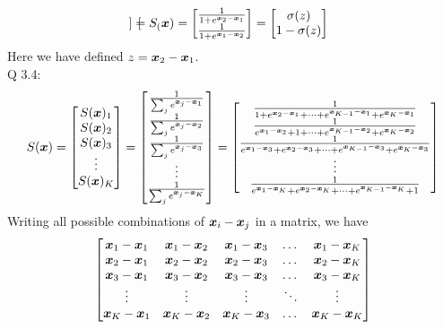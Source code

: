 {$$\begin{bmatrix}
\end{bmatrix}
=
S_({\bm{x}})=\begin{bmatrix}
    \frac{1}{1+e^{{\bm{x}}_2-{\bm{x}}_1}}\\
    \frac{1}{1+e^{{\bm{x}}_1-{\bm{x}}_2}}
\end{bmatrix}
=\begin{bmatrix}
    \sigma(z) \\
    1-\sigma(z)
\end{bmatrix}
$$
Here we have defined $z={\bm{x}}_2-{\bm{x}}_1$.\\
Q 3.4: $$S({\bm{x}})=\begin{bmatrix}
    S({\bm{x}})_1 \\
    S({\bm{x}})_2\\
    S({\bm{x}})_3\\ 
    \vdots  \\
     S({\bm{x}})_K
\end{bmatrix}
=
\begin{bmatrix}
    \frac{1}{\sum_j e^{{\bm{x}}_j-{\bm{x}}_1}}\\
    \frac{1}{\sum_j e^{{\bm{x}}_j-{\bm{x}}_2}}\\
    \frac{1}{\sum_j e^{{\bm{x}}_j-{\bm{x}}_3}}\\ 
    \vdots  \\
    \frac{1}{\sum_j e^{{\bm{x}}_j-{\bm{x}}_K}}
\end{bmatrix}
=
\begin{bmatrix}
    \frac{1}{1+e^{{\bm{x}}_2-{\bm{x}}_1}+\dots +e^{{\bm{x}}_{K-1}-{\bm{x}}_1}+e^{{\bm{x}}_K-{\bm{x}}_1}}\\
    \frac{1}{e^{{\bm{x}}_1-{\bm{x}}_2}+1+\dots +e^{{\bm{x}}_{K-1}-{\bm{x}}_2}+e^{{\bm{x}}_K-{\bm{x}}_2}}\\
    \frac{1}{e^{{\bm{x}}_1-{\bm{x}}_3}+e^{{\bm{x}}_2-{\bm{x}}_3}+\dots +e^{{\bm{x}}_{K-1}-{\bm{x}}_3}+e^{{\bm{x}}_K-{\bm{x}}_3}}\\ 
    \vdots  \\
    \frac{1}{e^{{\bm{x}}_1-{\bm{x}}_K}+e^{{\bm{x}}_2-{\bm{x}}_K}+\dots +e^{{\bm{x}}_{K-1}-{\bm{x}}_K}+1}
\end{bmatrix}
$$
Writing all possible combinations of ${\bm{x}}_i-{\bm{x}}_j$ in a matrix, we have 
$$\begin{bmatrix}
    {\bm{x}}_1-{\bm{x}}_1&{\bm{x}}_1-{\bm{x}}_2&{\bm{x}}_1-{\bm{x}}_3&\dots &{\bm{x}}_1-{\bm{x}}_K\\
    {\bm{x}}_2-{\bm{x}}_1&{\bm{x}}_2-{\bm{x}}_2&{\bm{x}}_2-{\bm{x}}_3&\dots &{\bm{x}}_2-{\bm{x}}_K\\
    {\bm{x}}_3-{\bm{x}}_1&{\bm{x}}_3-{\bm{x}}_2&{\bm{x}}_3-{\bm{x}}_3&\dots &{\bm{x}}_3-{\bm{x}}_K\\
    \vdots& \vdots & \vdots &\ddots &\vdots \\
     {\bm{x}}_K-{\bm{x}}_1&{\bm{x}}_K-{\bm{x}}_2&{\bm{x}}_K-{\bm{x}}_3&\dots &{\bm{x}}_K-{\bm{x}}_K\\
\end{bmatrix}
$$}
